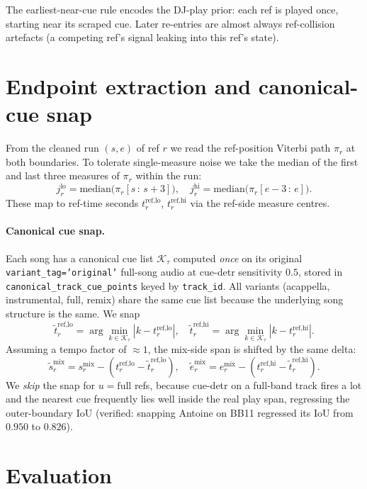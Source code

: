 \documentclass[11pt,a4paper]{article}
\begin{document}
The earliest-near-cue rule encodes the DJ-play prior: each ref is played once, starting near its scraped cue. Later re-entries are almost always ref-collision artefacts (a competing ref's signal leaking into this ref's state).

\section{Endpoint extraction and canonical-cue snap}

From the cleaned run $(s, e)$ of ref $r$ we read the ref-position Viterbi path $\pi_r$ at both boundaries. To tolerate single-measure noise we take the median of the first and last three measures of $\pi_r$ within the run:
\[
j^{\text{lo}}_r = \text{median}\big(\pi_r[s\,{:}\,s{+}3]\big), \quad j^{\text{hi}}_r = \text{median}\big(\pi_r[e{-}3\,{:}\,e]\big).
\]
These map to ref-time seconds $t^{\text{ref,lo}}_r$, $t^{\text{ref,hi}}_r$ via the ref-side measure centres.

\paragraph{Canonical cue snap.} Each song has a canonical cue list $\mathcal{K}_\tau$ computed \emph{once} on its original \texttt{variant\_tag='original'} full-song audio at cue-detr sensitivity $0.5$, stored in \texttt{canonical\_track\_cue\_points} keyed by \texttt{track\_id}. All variants (acappella, instrumental, full, remix) share the same cue list because the underlying song structure is the same. We snap
\[
\tilde t^{\text{ref,lo}}_r = \arg\min_{k \in \mathcal{K}_\tau} |k - t^{\text{ref,lo}}_r|, \quad \tilde t^{\text{ref,hi}}_r = \arg\min_{k \in \mathcal{K}_\tau} |k - t^{\text{ref,hi}}_r|.
\]
Assuming a tempo factor of $\approx 1$, the mix-side span is shifted by the same delta:
\[
\tilde s^{\text{mix}}_r = s^{\text{mix}}_r - (t^{\text{ref,lo}}_r - \tilde t^{\text{ref,lo}}_r), \quad
\tilde e^{\text{mix}}_r = e^{\text{mix}}_r - (t^{\text{ref,hi}}_r - \tilde t^{\text{ref,hi}}_r).
\]
We \emph{skip} the snap for $u = \text{full}$ refs, because cue-detr on a full-band track fires a lot and the nearest cue frequently lies well inside the real play span, regressing the outer-boundary IoU (verified: snapping Antoine on BB11 regressed its IoU from $0.950$ to $0.826$).

\section{Evaluation}
\end{document}
